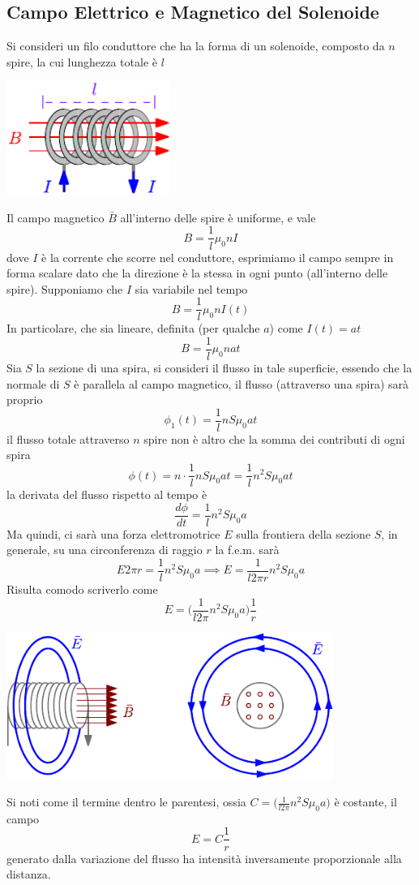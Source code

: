 \documentclass[10pt, letterpaper]{report}
\begin{document}
\subsection{Campo Elettrico e Magnetico del Solenoide}
Si consideri un filo conduttore che ha la forma di un solenoide, composto da $n$ spire, la cui lunghezza totale è $l$
\begin{center}
    \includegraphics[width=0.4\textwidth ]{images/campoSolenoide.pdf}
\end{center}
Il campo magnetico $\bar B$ all'interno delle spire è uniforme, e vale $$ B=\frac{1}{l}\mu_0n I$$
dove $I$ è la corrente che scorre nel conduttore, esprimiamo il campo sempre in forma scalare dato che la direzione è la stessa in ogni punto (all'interno delle spire). Supponiamo che $I$ sia variabile nel tempo 
$$ B=\frac{1}{l}\mu_0n I(t)$$
In particolare, che sia lineare, definita (per qualche $a$) come $I(t)=at$
$$ B=\frac{1}{l}\mu_0n at$$
Sia $S$ la sezione di una spira, si consideri il flusso in tale superficie, essendo che la normale di $S$ è parallela al campo magnetico, il flusso (attraverso una spira) sarà proprio 
$$ \phi_1(t)=\frac{1}{l}nS\mu_0at$$
il flusso  totale attraverso $n$ spire non è altro che la somma dei contributi di ogni spira 
$$ \phi(t)=n\cdot \frac{1}{l}nS\mu_0at= \frac{1}{l}n^2S\mu_0at$$
la derivata del flusso rispetto al tempo è 
$$ 
\dfrac{d\phi}{dt}=\frac{1}{l}n^2S\mu_0a$$
Ma quindi, ci sarà una forza elettromotrice $E$ sulla frontiera della sezione $S$, in generale, su una circonferenza di raggio $r$ la f.e.m. sarà 
$$ E2\pi r=\frac{1}{l}n^2S\mu_0a\implies E =\frac{1}{l2\pi r}n^2S\mu_0a $$
Risulta comodo scriverlo come 
$$ E=\Big(\frac{1}{l2\pi }n^2S\mu_0a\Big)\frac{1}{r}$$
\begin{center}
    \includegraphics[width=0.8\textwidth ]{images/solenoide.pdf}
\end{center}
Si noti come il termine dentro le parentesi, ossia $C=\Big(\frac{1}{l2\pi }n^2S\mu_0a\Big)$ è costante, il campo $$ E=C\frac{1}{r}$$
generato dalla variazione del flusso ha intensità inversamente proporzionale alla distanza. 
\end{document}

